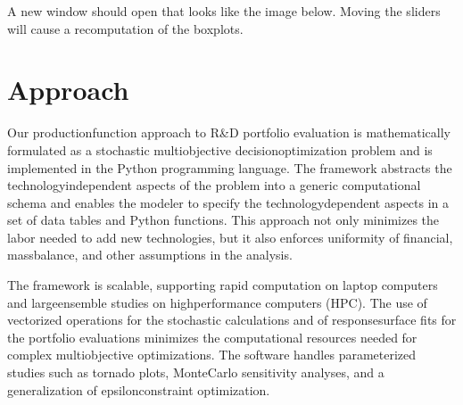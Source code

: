 \documentclass[letterpaper,10pt,english]{sphinxmanual}
\begin{document}
\begin{sphinxVerbatim}[commandchars=\\\{\}]
  
\end{sphinxVerbatim}

\sphinxAtStartPar
A new window should open that looks like the image below. Moving the
sliders will cause a recomputation of the boxplots.

\begin{sphinxVerbatim}[commandchars=\\\{\}]
\end{sphinxVerbatim}

\noindent{}

\sphinxstepscope


\chapter{Approach}
\label{\detokenize{approach:approach}}\label{\detokenize{approach:sec-approach}}\label{\detokenize{approach::doc}}
\sphinxAtStartPar
Our production\sphinxhyphen{}function approach to R\&D portfolio evaluation is
mathematically formulated as a stochastic multi\sphinxhyphen{}objective
decision\sphinxhyphen{}optimization problem and is implemented in the Python
programming language. The framework abstracts the technology\sphinxhyphen{}independent
aspects of the problem into a generic computational schema and enables
the modeler to specify the technology\sphinxhyphen{}dependent aspects in a set of data
tables and Python functions. This approach not only minimizes the labor
needed to add new technologies, but it also enforces uniformity of
financial, mass\sphinxhyphen{}balance, and other assumptions in the analysis.

\sphinxAtStartPar
The framework is scalable, supporting rapid computation on laptop
computers and large\sphinxhyphen{}ensemble studies on high\sphinxhyphen{}performance computers (HPC).
The use of vectorized operations for the stochastic calculations and of
response\sphinxhyphen{}surface fits for the portfolio evaluations minimizes the
computational resources needed for complex multi\sphinxhyphen{}objective
optimizations. The software handles parameterized studies such as
tornado plots, Monte\sphinxhyphen{}Carlo sensitivity analyses, and a generalization of
epsilon\sphinxhyphen{}constraint optimization.
\end{document}
